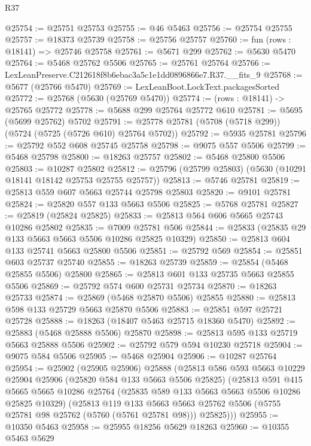\begin{lexlean}{R37}
\begin{coremodule}
@25754 := @25751 @25753
@25755 := @46 @5463
@25756 := @25754 @25755
@25757 := @18373 @25739
@25758 := @25756 @25757
@25760 := fun (rows : @18141) => @25746 @25758
@25761 := @5671 @299
@25762 := @5630 @5470
@25764 := @5468 @25762 @5506
@25765 := @25761 @25764
@25766 := LexLeanPreserve.C212618f8b6ebac3a5c1e1dd0896866e7.R37.__fits_9
@25768 := @5677 (@25766 @5470)
@25769 := LexLeanBoot.LockText.packagesSorted
@25772 := @25768 (@5630 (@25769 @5470))
@25774 := (rows : @18141) -> @25765 @25772
@25778 := @5688 @299 @25764 @25772 @610
@25781 := @5695 (@5699 @25762) @5702
@25791 := @25778 @25781 (@5708 (@5718 @299)) (@5724 (@5725 (@5726 @610) @25764 @5702))
@25792 := @5935 @25781
@25796 := @25792 @552 @608 @25745 @25758
@25798 := @9075 @557 @5506
@25799 := @5468 @25798
@25800 := @18263 @25757
@25802 := @5468 @25800 @5506
@25803 := @10287 @25802
@25812 := @25796 (@25799 @25803) (@5630 (@10291 @18141 @18142 @25753 @25755 @25757))
@25813 := @5746 @25781
@25819 := @25813 @559 @607 @5663 @25744 @25798 @25803
@25820 := @9101 @25781
@25824 := @25820 @557 @133 @5663 @5506
@25825 := @5768 @25781
@25827 := @25819 (@25824 @25825)
@25833 := @25813 @564 @606 @5665 @25743 @10286 @25802
@25835 := @7009 @25781 @506
@25844 := @25833 (@25835 @29 @133 @5663 @5663 @5506 @10286 @25825 @10329)
@25850 := @25813 @604 @133 @25741 @5663 @25800 @5506
@25851 := @25792 @569
@25854 := @25851 @603 @25737 @25740
@25855 := @18263 @25739
@25859 := @25854 (@5468 @25855 @5506) @25800
@25865 := @25813 @601 @133 @25735 @5663 @25855 @5506
@25869 := @25792 @574 @600 @25731 @25734
@25870 := @18263 @25733
@25874 := @25869 (@5468 @25870 @5506) @25855
@25880 := @25813 @598 @133 @25729 @5663 @25870 @5506
@25883 := @25851 @597 @25721 @25728
@25888 := @18263 (@18407 @5463 @25715 @18360 @5470)
@25892 := @25883 (@5468 @25888 @5506) @25870
@25898 := @25813 @595 @133 @25719 @5663 @25888 @5506
@25902 := @25792 @579 @594 @10230 @25718
@25904 := @9075 @584 @5506
@25905 := @5468 @25904
@25906 := @10287 @25764
@25954 := @25902
    (@25905 @25906)
    @25888
    (@25813
      @586
      @593
      @5663
      @10229
      @25904
      @25906
      (@25820 @584 @133 @5663 @5506 @25825)
      (@25813
        @591
        @415
        @5665
        @5665
        @10286
        @25764
        (@25835 @589 @133 @5663 @5663 @5506 @10286 @25825 @10329)
        (@25813
          @119
          @133
          @5663
          @5663
          @25762
          @5506
          (@5755 @25781 @98 @25762 (@5760 (@5761 @25781 @98)))
          @25825)))
@25955 := @10350 @5463
@25958 := @25955 @18256 @5629 @18263
@25960 := @10355 @5463 @5629

\end{coremodule}
\end{lexlean}
